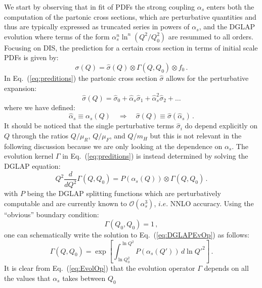 \documentclass[10pt,a4paper]{article}
\begin{document}
We start by observing that in fit of PDFs the strong coupling
$\alpha_s$ enters both the computation of the partonic cross sections,
which are perturbative quantities and thus are typically expressed as
truncated series in powers of $\alpha_s$, and the DGLAP evolution
where terms of the form $\alpha_s^n\ln^n(Q^2/Q_0^2)$ are resummed to
all orders. Focusing on DIS, the prediction for a certain cross
section in terms of initial scale PDFs is given by:
\begin{equation}\label{eq:preditions}
  \sigma(Q) = \hat{\sigma}(Q)\otimes\Gamma(Q,Q_0)\otimes f_0\,.
\end{equation}
In Eq.~(\ref{eq:preditions}) the partonic cross section $\hat{\sigma}$
allows for the perturbative expansion:
\begin{equation}\label{eq:exppartxsec}
  \hat{\sigma}(Q) = \hat{\sigma}_0 +\hat\alpha_s
  \hat{\sigma}_1 + \hat\alpha_s^2 \hat{\sigma}_2 + \dots
\end{equation}
where we have defined:
\begin{equation}
  \hat\alpha_s \equiv \alpha_s(Q)\quad\Longrightarrow \quad \hat{\sigma}(Q)
  \equiv \hat\sigma(\hat\alpha_s)\,.
\end{equation}
It should be noticed that the single perturbative terms
$\hat{\sigma}_i$ do depend explicitly on $Q$ through the ratios
$Q/\mu_R$, $Q/\mu_F$, and $Q/m_H$ but this is not relevant in the
following discussion because we are only looking at the dependence on
$\alpha_s$. The evolution kernel $\Gamma$ in Eq.~(\ref{eq:preditions})
is instead determined by solving the DGLAP equation:
\begin{equation}\label{eq:DGLAPEvOp}
Q^2\frac{d}{dQ^2}\Gamma(Q,Q_0) =
P(\alpha_s(Q))\otimes \Gamma(Q,Q_0)\,.
\end{equation}
with $P$ being the DGLAP splitting functions which are perturbatively
computable and are currently known to $\mathcal{O}(\alpha_s^3)$,
$i.e.$ NNLO accuracy. Using the ``obvious'' boundary condition:
\begin{equation}
\Gamma(Q_0,Q_0) = 1\,,
\end{equation}
one can schematically write the solution to Eq.~(\ref{eq:DGLAPEvOp})
as follows:
\begin{equation}\label{eq:EvolOp}
\Gamma(Q,Q_0) = \exp\left[\int_{\ln Q_0^2}^{\ln Q^2}P(\alpha_s(Q'))\,d\ln Q'^2\right]\,.
\end{equation}
It is clear from Eq.~(\ref{eq:EvolOp}) that the evolution operator
$\Gamma$ depends on all the values that $\alpha_s$ takes between $Q_0$
\end{document}
